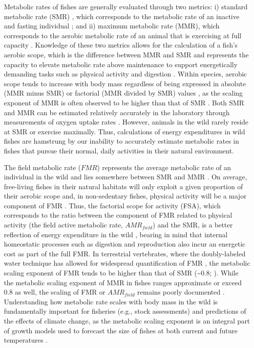 \documentclass[
]{article}
\begin{document}
\par

Metabolic rates of fishes are generally evaluated through two metrics:
i) standard metabolic rate (SMR) \citep{Fry1957, Vinberg1960}, which
corresponds to the metabolic rate of an inactive and fasting individual
\citep{Clark2013}; and ii) maximum metabolic rate (MMR), which
corresponds to the aerobic metabolic rate of an animal that is
exercising at full capacity \citep{Norin2016}. Knowledge of these two
metrics allows for the calculation of a fish's aerobic scope, which is
the difference between MMR and SMR and represents the capacity to
elevate metabolic rate above maintenance to support energetically
demanding tasks such as physical activity and digestion
\citep{Clark2013}. Within species, aerobic scope tends to increase with
body mass regardless of being expressed in absolute (MMR minus SMR) or
factorial (MMR divided by SMR) values \citep{Halsey2018}, as the scaling
exponent of MMR is often observed to be higher than that of SMR
\citep{Killen2007, Glazier2005}. Both SMR and MMR can be estimated
relatively accurately in the laboratory through measurements of oxygen
uptake rates \citep{Clark2013, Norin2016, Svendsen2016, Chabot2016}.
However, animals in the wild rarely reside at SMR or exercise maximally.
Thus, calculations of energy expenditures in wild fishes are hamstrung
by our inability to accurately estimate metabolic rates in fishes that
pursue their normal, daily activities in their natural environment.

The field metabolic rate (\(FMR\)) represents the average metabolic rate
of an individual in the wild \citep{Chung2019, Nagy2005} and lies
somewhere between SMR and MMR \citep{Nagy2005}. On average, free-living
fishes in their natural habitats will only exploit a given proportion of
their aerobic scope and, in non-sedentary fishes, physical activity will
be a major component of FMR \citep{Chung2019}. Thus, the factorial scope
for activity (FSA), which corresponds to the ratio between the component
of FMR related to physical activity (the field active metabolic rate,
\(AMR_{field}\)) and the SMR, is a better reflection of energy
expenditure in the wild \citep{Chung2019}, bearing in mind that internal
homeostatic processes such as digestion and reproduction also incur an
energetic cost as part of the full FMR. In terrestrial vertebrates,
where the doubly-labeled water technique has allowed for widespread
quantification of FMR \citep{Webster1989}, the metabolic scaling
exponent of FMR tends to be higher than that of SMR (\textasciitilde0.8;
\citet{Nagy2005}). While the metabolic scaling exponent of MMR in fishes
ranges approximate or exceed 0.8 as well, the scaling of FMR or
\(AMR_{field}\) remains poorly documented \citep{Norin2016}.
Understanding how metabolic rate scales with body mass in the wild is
fundamentally important for fisheries (e.g., stock assessments) and
predictions of the effects of climate change, as the metabolic scaling
exponent is an integral part of growth models used to forecast the size
of fishes at both current and future temperatures
\citep{Vonbertalanffy1957, Cheung2013, Deutsch2015, Marshall2019}.
\end{document}
